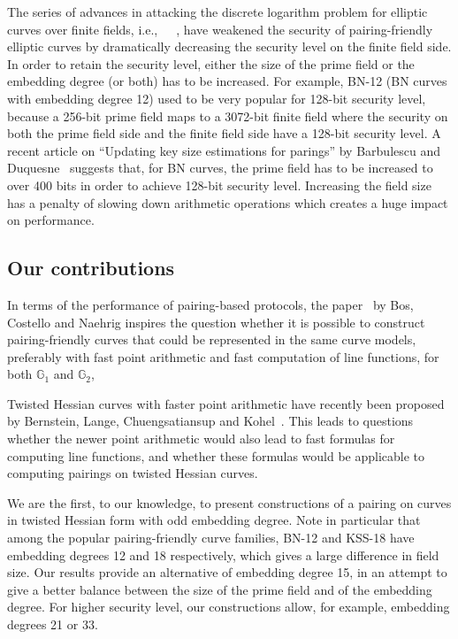 The series of advances in attacking the discrete logarithm problem for elliptic curves over finite fields,
i.e.,~\cite{2016/KB}~\cite{2015/BGGM}~\cite{2015/BGK},
have weakened the security of pairing-friendly elliptic curves by dramatically decreasing the security level on the finite field side.
In order to retain the security level, either the size of the prime field or the embedding degree (or both) has to be increased.
For example, BN-12 (BN curves with embedding degree 12) used to be very popular for 128-bit security level,
because a 256-bit prime field maps to a 3072-bit finite field
where the security on both the prime field side and the finite field side have a 128-bit security level.
A recent article on ``Updating key size estimations for parings'' by Barbulescu and Duquesne~\cite{2017/keysize}
suggests that, for BN curves, the prime field has to be increased to over 400 bits in order to achieve 128-bit security level.
Increasing the field size has a penalty of slowing down arithmetic operations which creates a huge impact on performance.


\subsection{Our contributions}

In terms of the performance of pairing-based protocols,
the paper~\cite{2013/bos-pairing} by Bos, Costello and Naehrig
inspires the question whether it is possible to
construct pairing-friendly curves that could be represented in the same curve models,
preferably with fast point arithmetic and fast computation of line functions,
for both $\mathbb{G}_1$ and $\mathbb{G}_2$,

Twisted Hessian curves with faster point arithmetic have recently been proposed by
Bernstein, Lange, Chuengsatiansup and Kohel~\cite{2015/hessian}.
This leads to questions whether the newer point arithmetic would also lead to fast formulas for computing line functions,
and whether these formulas would be applicable to computing pairings on twisted Hessian curves.

We are the first, to our knowledge, to present constructions of a pairing on curves in twisted Hessian form with odd embedding degree.
Note in particular that among the popular pairing-friendly curve families,
BN-12 and KSS-18 have embedding degrees 12 and 18 respectively, which gives a large difference in field size.
Our results provide an alternative of embedding degree 15,
in an attempt to give a better balance between the size of the prime field and of the embedding degree.
For higher security level, our constructions allow, for example, embedding degrees 21 or 33.

